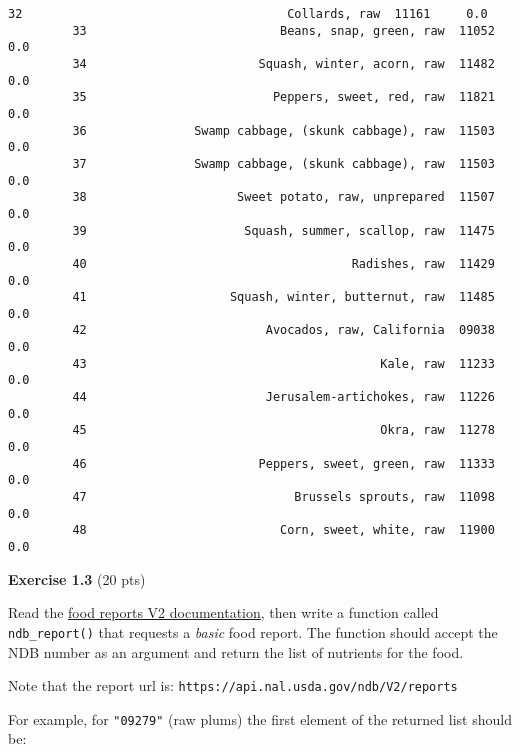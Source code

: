 \documentclass[11pt]{article}
\begin{document}
\begin{Verbatim}[commandchars=\\\{\}]
         32                                     Collards, raw  11161     0.0  
         33                           Beans, snap, green, raw  11052     0.0  
         34                        Squash, winter, acorn, raw  11482     0.0  
         35                          Peppers, sweet, red, raw  11821     0.0  
         36               Swamp cabbage, (skunk cabbage), raw  11503     0.0  
         37               Swamp cabbage, (skunk cabbage), raw  11503     0.0  
         38                     Sweet potato, raw, unprepared  11507     0.0  
         39                      Squash, summer, scallop, raw  11475     0.0  
         40                                     Radishes, raw  11429     0.0  
         41                    Squash, winter, butternut, raw  11485     0.0  
         42                         Avocados, raw, California  09038     0.0  
         43                                         Kale, raw  11233     0.0  
         44                         Jerusalem-artichokes, raw  11226     0.0  
         45                                         Okra, raw  11278     0.0  
         46                        Peppers, sweet, green, raw  11333     0.0  
         47                             Brussels sprouts, raw  11098     0.0  
         48                           Corn, sweet, white, raw  11900     0.0  
\end{Verbatim}
            
    \textbf{Exercise 1.3} (20 pts)

Read the
\href{https://ndb.nal.usda.gov/ndb/doc/apilist/API-FOOD-REPORTV2.md}{food
reports V2 documentation}, then write a function called
\texttt{ndb\_report()} that requests a \emph{basic} food report. The
function should accept the NDB number as an argument and return the list
of nutrients for the food.

Note that the report url is:
\texttt{https://api.nal.usda.gov/ndb/V2/reports}

For example, for \texttt{"09279"} (raw plums) the first element of the
returned list should be:
\end{document}
